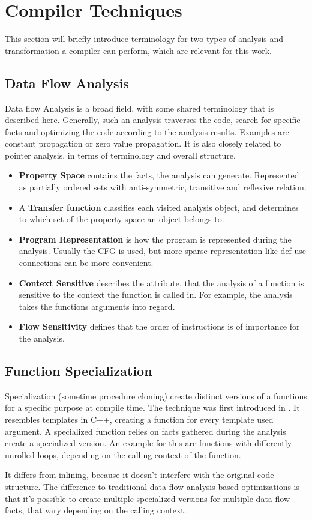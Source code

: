 \section{Compiler Techniques}
This section will briefly introduce terminology for two types of analysis and transformation a compiler can perform, which are relevant
for this work.
\subsection{Data Flow Analysis}
Data flow Analysis is a broad field, with some shared terminology that is described here. Generally, such an analysis traverses the code,
search for specific facts and optimizing the code according to the analysis results. Examples are constant propagation or zero value propagation. It is also closely related to pointer analysis, in terms of terminology and overall structure.
\begin{itemize}
	\item \textbf{Property Space} contains the facts, the analysis can generate. Represented as partially ordered sets with anti-symmetric, transitive and reflexive relation.\cite{Rastello:2016:SCD:3002539}
	\item A \textbf{Transfer function} classifies each visited analysis object, and determines to which set of the property space an object belongs to. \cite{Rastello:2016:SCD:3002539}
	\item \textbf{Program Representation} is how the program is represented during the analysis. Usually the CFG is used, but more sparse representation like def-use connections can be more convenient. \cite{Rastello:2016:SCD:3002539}
	\item \textbf{Context Sensitive} describes the attribute, that the analysis of a function is sensitive to the context the function is called in. For example, the analysis
	takes the functions arguments into regard. \cite{Emami:1994:CIP:178243.178264}
	\item \textbf{Flow Sensitivity} defines that the order of instructions is of importance for the analysis. \cite{Hardekopf:2009:SFP:1480881.1480911}
\end{itemize}

\subsection{Function Specialization}
Specialization (sometime procedure cloning) create distinct versions of a functions for a specific purpose at compile time. The technique was first introduced in \cite{Cooper:1993:MPC:2245763.2246020}. It resembles templates in C++, creating a function for every template used argument. A specialized function relies on facts gathered during the analysis create a specialized version. An example for this are functions with differently unrolled loops, depending on the calling context of the function.

It differs from inlining, because it doesn't interfere with the original code structure. The difference to traditional data-flow analysis based optimizations is that it's possible to create multiple specialized versions for multiple data-flow facts, that vary depending on the calling context.   